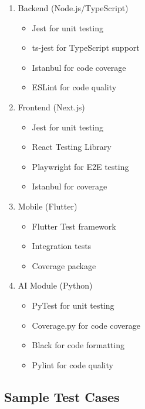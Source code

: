\begin{enumerate}
    \item Backend (Node.js/TypeScript)
    \begin{itemize}
        \item Jest for unit testing
        \item ts-jest for TypeScript support
        \item Istanbul for code coverage
        \item ESLint for code quality
    \end{itemize}
    
    \item Frontend (Next.js)
    \begin{itemize}
        \item Jest for unit testing
        \item React Testing Library
        \item Playwright for E2E testing
        \item Istanbul for coverage
    \end{itemize}
    
    \item Mobile (Flutter)
    \begin{itemize}
        \item Flutter Test framework
        \item Integration tests
        \item Coverage package
    \end{itemize}
    
    \item AI Module (Python)
    \begin{itemize}
        \item PyTest for unit testing
        \item Coverage.py for code coverage
        \item Black for code formatting
        \item Pylint for code quality
    \end{itemize}
\end{enumerate}

\subsection{Sample Test Cases}

